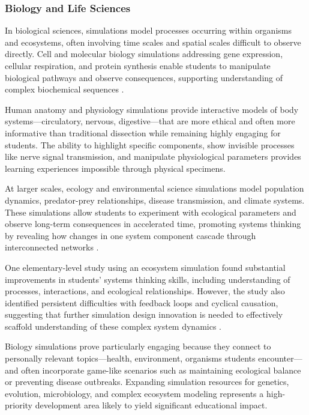 \subsubsection{Biology and Life Sciences}

In biological sciences, simulations model processes occurring within organisms and ecosystems, often involving time scales and spatial scales difficult to observe directly. Cell and molecular biology simulations addressing gene expression, cellular respiration, and protein synthesis enable students to manipulate biological pathways and observe consequences, supporting understanding of complex biochemical sequences \cite{mdpi2024}.

Human anatomy and physiology simulations provide interactive models of body systems---circulatory, nervous, digestive---that are more ethical and often more informative than traditional dissection while remaining highly engaging for students. The ability to highlight specific components, show invisible processes like nerve signal transmission, and manipulate physiological parameters provides learning experiences impossible through physical specimens.

At larger scales, ecology and environmental science simulations model population dynamics, predator-prey relationships, disease transmission, and climate systems. These simulations allow students to experiment with ecological parameters and observe long-term consequences in accelerated time, promoting systems thinking by revealing how changes in one system component cascade through interconnected networks \cite{eric2009}.

One elementary-level study using an ecosystem simulation found substantial improvements in students' systems thinking skills, including understanding of processes, interactions, and ecological relationships. However, the study also identified persistent difficulties with feedback loops and cyclical causation, suggesting that further simulation design innovation is needed to effectively scaffold understanding of these complex system dynamics \cite{eric2009}.

Biology simulations prove particularly engaging because they connect to personally relevant topics---health, environment, organisms students encounter---and often incorporate game-like scenarios such as maintaining ecological balance or preventing disease outbreaks. Expanding simulation resources for genetics, evolution, microbiology, and complex ecosystem modeling represents a high-priority development area likely to yield significant educational impact.

